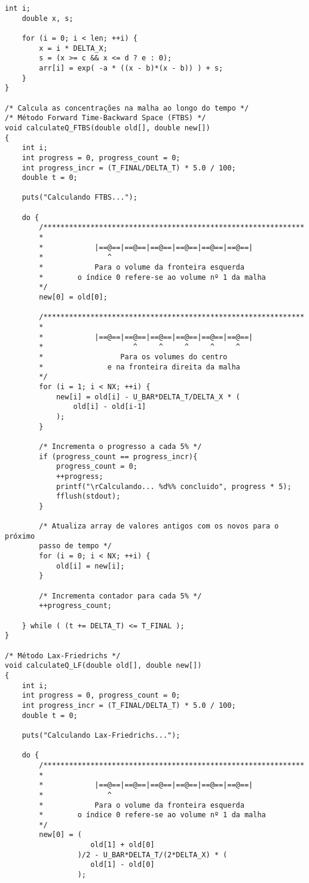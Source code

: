 \begin{Verbatim}[fontsize=\footnotesize]
    int i;
    double x, s;

    for (i = 0; i < len; ++i) {
        x = i * DELTA_X;
        s = (x >= c && x <= d ? e : 0);
        arr[i] = exp( -a * ((x - b)*(x - b)) ) + s;
    }
}

/* Calcula as concentrações na malha ao longo do tempo */
/* Método Forward Time-Backward Space (FTBS) */
void calculateQ_FTBS(double old[], double new[])
{
    int i;
    int progress = 0, progress_count = 0;
    int progress_incr = (T_FINAL/DELTA_T) * 5.0 / 100;
    double t = 0;

    puts("Calculando FTBS...");

    do {
        /*************************************************************
        *
        *            |==@==|==@==|==@==|==@==|==@==|==@==|
        *               ^
        *            Para o volume da fronteira esquerda
        *        o índice 0 refere-se ao volume nº 1 da malha
        */
        new[0] = old[0];

        /*************************************************************
        *
        *            |==@==|==@==|==@==|==@==|==@==|==@==|
        *                     ^     ^     ^     ^     ^
        *                  Para os volumes do centro
        *               e na fronteira direita da malha
        */
        for (i = 1; i < NX; ++i) {
            new[i] = old[i] - U_BAR*DELTA_T/DELTA_X * (
                old[i] - old[i-1]
            );
        }

        /* Incrementa o progresso a cada 5% */
        if (progress_count == progress_incr){
            progress_count = 0;
            ++progress;
            printf("\rCalculando... %d%% concluido", progress * 5);
            fflush(stdout);
        }

        /* Atualiza array de valores antigos com os novos para o próximo
        passo de tempo */
        for (i = 0; i < NX; ++i) {
            old[i] = new[i];
        }

        /* Incrementa contador para cada 5% */
        ++progress_count;

    } while ( (t += DELTA_T) <= T_FINAL );
}

/* Método Lax-Friedrichs */
void calculateQ_LF(double old[], double new[])
{
    int i;
    int progress = 0, progress_count = 0;
    int progress_incr = (T_FINAL/DELTA_T) * 5.0 / 100;
    double t = 0;

    puts("Calculando Lax-Friedrichs...");

    do {
        /*************************************************************
        *
        *            |==@==|==@==|==@==|==@==|==@==|==@==|
        *               ^
        *            Para o volume da fronteira esquerda
        *        o índice 0 refere-se ao volume nº 1 da malha
        */
        new[0] = (
                    old[1] + old[0]
                 )/2 - U_BAR*DELTA_T/(2*DELTA_X) * (
                    old[1] - old[0]
                 );


\end{Verbatim}
